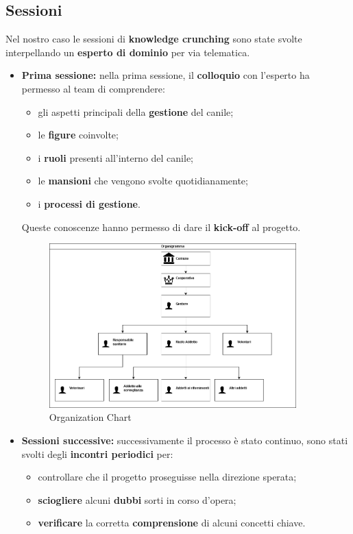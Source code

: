     \subsection{Sessioni}
	Nel nostro caso le sessioni di \textbf{knowledge crunching} sono state svolte interpellando un \textbf{esperto di dominio} per via telematica.
	\begin{itemize}
	    \item \textbf{Prima sessione:} nella prima sessione, il \textbf{colloquio} con l'esperto ha permesso al team di comprendere:
	    \begin{itemize}
	        \item gli aspetti principali della \textbf{gestione} del canile;
	        \item le \textbf{figure} coinvolte;
	        \item i \textbf{ruoli} presenti all'interno del canile;
	        \item le \textbf{mansioni} che vengono svolte quotidianamente;
	        \item i \textbf{processi di gestione}.
	    \end{itemize}
	    Queste conoscenze hanno permesso di dare il \textbf{kick-off} al progetto.
        \begin{figure}[ht]
            \caption{Organization Chart}
            \centering
            \includegraphics[width=0.9\textwidth]{DrawIo/organizationChart.png}
        \end{figure}
	    \item \textbf{Sessioni successive:} successivamente il processo è stato continuo, sono stati svolti degli \textbf{incontri periodici} per:
	    \begin{itemize}
	        \item controllare che il progetto proseguisse nella direzione sperata;
	        \item \textbf{sciogliere} alcuni \textbf{dubbi} sorti in corso d'opera;
	        \item \textbf{verificare} la corretta \textbf{comprensione} di alcuni concetti chiave. 
	    \end{itemize}
	\end{itemize}
    
